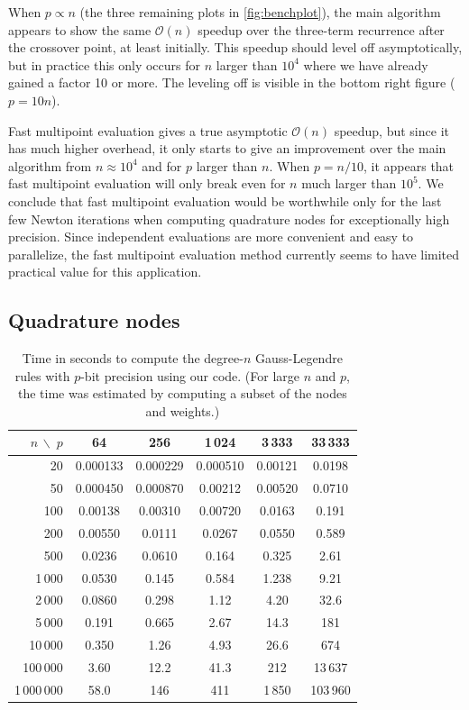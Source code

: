 \documentclass[nohypdvips,review]{siamart0216}
\newcommand{\OO}{\mathcal{O}}
\begin{document}
When $p \propto n$ (the three remaining plots in \cref{fig:benchplot}), the main algorithm
appears to show the same $\OO(n)$ speedup
over the three-term recurrence after the crossover point, at least initially.
This speedup should level off asymptotically, but
in practice this only occurs for $n$ larger than $10^4$
where we have already gained a factor 10 or more.
The leveling off is visible in the bottom right figure ($p = 10n$).

Fast multipoint evaluation gives a true asymptotic $\OO(n)$ speedup,
but since it has much higher overhead,
it only starts to give an improvement over
the main algorithm from $n \approx 10^4$
and for $p$ larger than $n$.
When $p = n / 10$, it appears that
fast multipoint evaluation will only break even for $n$ much larger than $10^5$.
We conclude that fast multipoint evaluation would be
worthwhile only for the last few Newton iterations
when computing quadrature nodes for exceptionally high precision.
Since independent evaluations are more convenient and easy to parallelize,
the fast multipoint evaluation method
currently seems to have limited practical value for this application.

\subsection{Quadrature nodes}

\begin{table}[t!]
\caption{Time in seconds to compute the degree-$n$ Gauss-Legendre rules with $p$-bit precision
using our code.
(For large $n$ and $p$, the time was estimated by computing a subset of the nodes and weights.)}
\label{tab:timings}
\begin{center}
\begin{tabular}{ r | c c c c c }
$n\, \backslash \; p$ & 64 & 256 & 1\,024 & 3\,333 & 33\,333 \\
\hline\rule{0pt}{3ex}
20  & 0.000133  &  0.000229  &  0.000510  &  0.00121  &  0.0198  \\
50  & 0.000450  &  0.000870  &  0.00212  &  0.00520  &  0.0710  \\
100  & 0.00138  &  0.00310  &  0.00720  &  0.0163  &  0.191  \\
200  & 0.00550  &  0.0111  &  0.0267  &  0.0550  &  0.589  \\
500  & 0.0236  &  0.0610  &  0.164  &  0.325  &  2.61  \\
1\,000  & 0.0530  &  0.145  &  0.584  &  1.238  &  9.21  \\
2\,000  & 0.0860  &  0.298  &  1.12  &  4.20  &  32.6  \\
5\,000  & 0.191  &  0.665  &  2.67  &  14.3  &  181  \\
10\,000  & 0.350  &  1.26  &  4.93  &  26.6  &  674  \\
100\,000  & 3.60  &  12.2  &  41.3  &  212  &  13\,637  \\
1\,000\,000  & 58.0  &  146  &  411  &  1\,850  &  103\,960  \\
\end{tabular}
\end{center}
\end{table}
\end{document}
